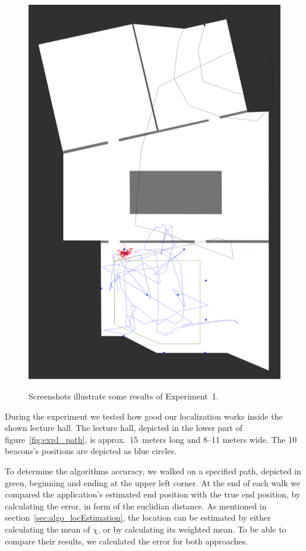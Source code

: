 \begin{figure}
{		\includegraphics[height=0.45\textheight]{figures/eval_1_3}
		\label{fig:exp1_img_3}
	}
	\caption{Screenshots illustrate some results of Experiment~1.}
	\label{fig:exp1_screenshot}
\end{figure}

During the experiment we tested how good our localization works inside the shown lecture hall. The lecture hall, depicted in the lower part of figure~\ref{fig:exp1_path}, is approx.\ 15~meters long and 8–11 meters wide. The 10 beacons's positions are depicted as blue circles.

To determine the algorithms accuracy, we walked on a specified path, depicted in green, beginning and ending at the upper left corner. At the end of each walk we compared the application's estimated end position with the true end position, by calculating the error, in form of the euclidian distance. As mentioned in section~\ref{sec:algo_locEstimation}, the location can be estimated by either calculating the mean of $\chi$, or by calculating its weighted mean. To be able to compare their results, we calculated the error for both approaches.

